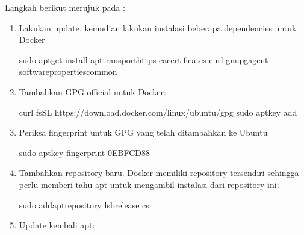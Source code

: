 \documentclass[letterpaper,10pt,english]{sphinxmanual}
\begin{document}
Langkah berikut merujuk pada :
\begin{enumerate}
%
\item {} 
Lakukan update, kemudian lakukan instalasi beberapa dependencies untuk Docker

\begin{sphinxVerbatim}[commandchars=\\\{\}]
sudo apt\PYGZhy{}get install 
 apt\PYGZhy{}transport\PYGZhy{}https 
 ca\PYGZhy{}certificates 
 curl 
 gnupg\PYGZhy{}agent 
 software\PYGZhy{}properties\PYGZhy{}common
\end{sphinxVerbatim}

\item {} 
Tambahkan GPG official untuk Docker:

\begin{sphinxVerbatim}[commandchars=\\\{\}]
curl \PYGZhy{}fsSL https://download.docker.com/linux/ubuntu/gpg  sudo apt\PYGZhy{}key add \PYGZhy{}
\end{sphinxVerbatim}

\item {} 
Periksa  fingerprint untuk GPG yang telah ditambahkan ke Ubuntu

\begin{sphinxVerbatim}[commandchars=\\\{\}]
sudo apt\PYGZhy{}key fingerprint 0EBFCD88
\end{sphinxVerbatim}

\item {} 
Tambahkan repository baru. Docker memiliki repository tersendiri sehingga perlu memberi tahu apt untuk mengambil instalasi dari repository ini:

\begin{sphinxVerbatim}[commandchars=\\\{\}]
sudo add\PYGZhy{}apt\PYGZhy{}repository 
lsb\PYGZus{}release \PYGZhy{}cs
\end{sphinxVerbatim}

\item {} 
Update kembali apt:


\end{enumerate}
\end{document}
